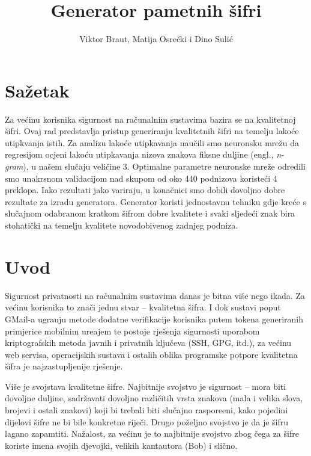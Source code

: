 \documentclass[a4paper,twocolumn,dvipdfm]{article}
\begin{document}
\title{Generator pametnih \v{s}ifri}
\author{Viktor Braut, Matija Osre\v{c}ki i Dino Suli\'c}
\maketitle

\section*{Sa\v{z}etak}

Za ve\'cinu korisnika sigurnost na ra\v{c}unalnim sustavima bazira se na
kvalitetnoj \v{s}ifri. Ovaj rad predstavlja pristup generiranju kvalitetnih
\v{s}ifri na temelju lako\'ce utipkvanja istih. Za analizu lako\'ce utipkavanja
nau\v{c}ili smo neuronsku mre\v{z}u da regresijom ocjeni lako\'cu utipkavanja
nizova znakova fiksne duljine (engl., \emph{n-gram}), u na\v{s}em slu\v{c}aju
veli\v{c}ine 3. Optimalne parametre neuronske mre\v{z}e odredili smo unakrsnom
validacijom nad skupom od oko 440 podnizova koriste\'ci 4 preklopa. Iako
rezultati jako variraju, u kona\v{c}nici smo dobili dovoljno dobre rezultate za
izradu generatora. Generator koristi jednostavnu tehniku gdje kre\'ce s
slu\v{c}ajnom odabranom kratkom \v{s}ifrom dobre kvalitete i svaki sljede\'ci znak bira
stohati\v{c}ki na temelju kvalitete novodobivenog zadnjeg podniza.

\section{Uvod}

Sigurnost privatnosti na ra\v{c}unalnim sustavima danas je bitna vi\v{s}e nego
ikada. Za ve\'cinu korisnika to zna\v{c}i jednu stvar -- kvalitetna \v{s}ifra.
I dok sustavi poput GMail-a ugra\dj uju metode dodatne verifikacije korisnika
putem tokena generiranih primjerice mobilnim ure\dj ajem te postoje
rje\v{s}enja sigurnosti uporabom kriptografskih metoda javnih i privatnih
klju\v{c}eva (SSH, GPG, itd.), za ve\'cinu web servisa, operacijskih sustava i
ostalih oblika programske potpore kvalitetna \v{s}ifra je najzastupljenije
rje\v{s}enje. 

Vi\v{s}e je svojstava kvalitetne \v{s}ifre. Najbitnije svojstvo je sigurnost --
mora biti dovoljne duljine, sadr\v{z}avati dovoljno razli\v{c}itih vrsta
znakova (mala i velika slova, brojevi i ostali znakovi) koji bi trebali biti
slu\v{c}ajno raspore\dj eni, kako pojedini dijelovi \v{s}ifre ne bi bile
konkretne rije\v{c}i. Drugo po\v{z}eljno svojstvo je da je \v{s}ifru lagano
zapamtiti. Na\v{z}alost, za ve\'cinu je to najbitnije svojstvo zbog \v{c}ega za
\v{s}ifre koriste imena svojih djevojki, velikih kantautora (Bob) i sli\v{c}no.
\end{document}
